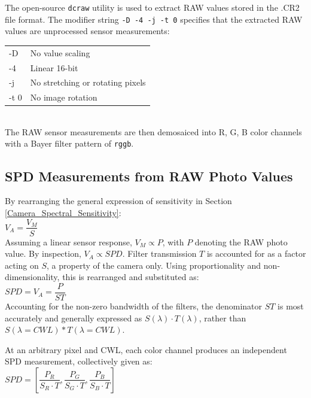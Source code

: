 \documentclass[twocolumn,10pt]{asme2ej}
\newcommand{\id}{\hspace{6 mm}}
\begin{document}
The open-source \texttt{dcraw} utility is used to extract RAW values stored in the .CR2 file format. The modifier string \texttt{-D -4 -j -t 0} specifies that the extracted RAW values are unprocessed sensor measurements:\\

\begin{tabular}{l | l}
-D & No value scaling \\
-4 & Linear 16-bit \\
-j & No stretching or rotating pixels \\
-t 0 & No image rotation \\
\end{tabular} \\

 The RAW sensor measurements are then demosaiced into R, G, B color channels with a Bayer filter pattern of \texttt{rggb}.

\subsection{SPD Measurements from RAW Photo Values}

 By rearranging the general expression of sensitivity in Section \ref{Camera_Spectral_Sensitivity}: \\

 $V_A = \dfrac{V_M}{S}$ \\

Assuming a linear sensor response, $V_M \propto P$, with $P$ denoting the RAW photo value. By inspection, $V_A \propto SPD$. Filter transmission $T$ is accounted for as a factor acting on $S$, a property of the camera only. Using proportionality and non-dimensionality, this is rearranged and substituted as: \\

 $SPD = V_A = \dfrac{P}{ST}$ \\

Accounting for the non-zero bandwidth of the filters, the denominator $ST$ is most accurately and generally expressed as $S(\lambda) \cdot T(\lambda)$, rather than $S(\lambda=CWL)*T(\lambda=CWL)$.

\id At an arbitrary pixel and CWL, each color channel produces an independent SPD measurement, collectively given as: \\

 $SPD = \left[ \dfrac{P_R}{S_R \cdot T},\dfrac{P_G}{S_G \cdot T},\dfrac{P_B}{S_B \cdot T} \right] $ \\
\end{document}
